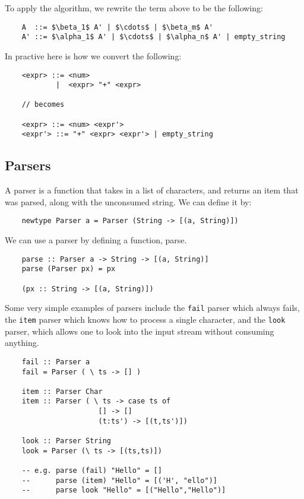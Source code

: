 \documentclass[a4paper,12pt]{article}
\theoremstyle{remark}
\begin{document}
To apply the algorithm, we rewrite the term above to be the following:

\begin{lstlisting}
    A  ::= $\beta_1$ A' | $\cdots$ | $\beta_m$ A'
    A' ::= $\alpha_1$ A' | $\cdots$ | $\alpha_n$ A' | empty_string  \end{lstlisting}

In practive here is how we convert the following:

\begin{lstlisting}
    <expr> ::= <num>
            |  <expr> "+" <expr>

    // becomes

    <expr> ::= <num> <expr'>
    <expr'> ::= "+" <expr> <expr'> | empty_string  \end{lstlisting}

\subsection{Parsers}

A parser is a function that takes in a list of characters, and returns an item that
was parsed, along with the unconsumed string. We can define it by:

\begin{lstlisting}
    newtype Parser a = Parser (String -> [(a, String)])  \end{lstlisting}

We can use a parser by defining a function, parse.

\begin{lstlisting}
    parse :: Parser a -> String -> [(a, String)]
    parse (Parser px) = px

    (px :: String -> [(a, String)])  \end{lstlisting}

Some very simple examples of parsers include the \lstinline{fail} parser which always fails,
the \lstinline{item} parser which knows how to process a single character, and the
\lstinline{look} parser, which allows one to look into the input stream without consuming anything.

\begin{lstlisting}
    fail :: Parser a
    fail = Parser ( \ ts -> [] )

    item :: Parser Char
    item :: Parser ( \ ts -> case ts of
                      [] -> []
                      (t:ts') -> [(t,ts')])

    look :: Parser String
    look = Parser (\ ts -> [(ts,ts)])

    -- e.g. parse (fail) "Hello" = []
    --      parse (item) "Hello" = [('H', "ello")]
    --      parse look "Hello" = [("Hello","Hello")]  \end{lstlisting}
\end{document}
